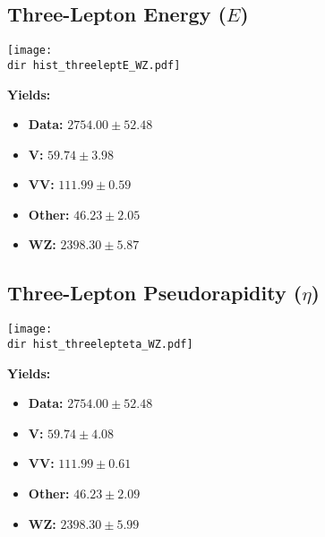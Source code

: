 \documentclass[a4paper,12pt]{article}
\newcommand{\dir}{HZZ-ResultsCL-ibrahim_analysis-03.05.2025_11h/}
\begin{document}
\subsection*{Three-Lepton Energy ($E$)}
\begin{minipage}{0.6\textwidth}
    \centering
    \texttt{[image: \\dir hist\_threeleptE\_WZ.pdf]}
    \label{fig:threeleptE}
\end{minipage}%
\begin{minipage}{0.4\textwidth}
    \textbf{Yields:}
    \begin{itemize}
        \item \textbf{Data:} $2754.00 \pm 52.48$
        \item \textbf{V:} $59.74 \pm 3.98$
        \item \textbf{VV:} $111.99 \pm 0.59$
        \item \textbf{Other:} $46.23 \pm 2.05$
        \item \textbf{WZ:} $2398.30 \pm 5.87$
    \end{itemize}
\end{minipage}

\subsection*{Three-Lepton Pseudorapidity ($\eta$)}
\begin{minipage}{0.6\textwidth}
    \centering
    \texttt{[image: \\dir hist\_threelepteta\_WZ.pdf]}
    \label{fig:threelepteta}
\end{minipage}%
\begin{minipage}{0.4\textwidth}
    \textbf{Yields:}
    \begin{itemize}
        \item \textbf{Data:} $2754.00 \pm 52.48$
        \item \textbf{V:} $59.74 \pm 4.08$
        \item \textbf{VV:} $111.99 \pm 0.61$
        \item \textbf{Other:} $46.23 \pm 2.09$
        \item \textbf{WZ:} $2398.30 \pm 5.99$
    \end{itemize}
\end{minipage}
\end{document}
